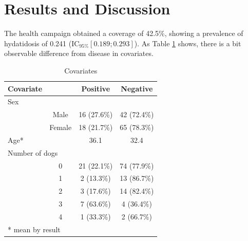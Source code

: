 \documentclass[10pt,letterpaper]{article}
\begin{document}
\section*{Results and Discussion}
The health campaign obtained a coverage of 42.5\%, showing a prevalence of hydatidosis of 0.241 (IC$_{95\%} \left[ 0.189; 0.293 \right] $). As Table \ref{covariates} shows, there is a bit observable difference from disease in covariates.
\begin{table}[htbp]
  \centering
    \begin{tabular}{llll}
    \toprule
    \textbf{Covariate} &       & \multicolumn{1}{c}{\textbf{Positive}} & \multicolumn{1}{c}{\textbf{Negative}} \\
    \midrule
    \multicolumn{2}{l}{Sex} &       &  \\
          & \multicolumn{1}{c}{Male} & \multicolumn{1}{c}{16 (27.6\%)} & \multicolumn{1}{c}{42 (72.4\%)} \\
          & \multicolumn{1}{c}{Female} & \multicolumn{1}{c}{18 (21.7\%)} & \multicolumn{1}{c}{65 (78.3\%)} \\
    \midrule
    \multicolumn{2}{l}{Age*} & \multicolumn{1}{c}{36.1} & \multicolumn{1}{c}{32.4} \\
    \midrule
    \multicolumn{2}{l}{Number of dogs} &       &  \\
          & \multicolumn{1}{c}{0} & \multicolumn{1}{c}{21 (22.1\%)} & \multicolumn{1}{c}{74 (77.9\%)} \\
          & \multicolumn{1}{c}{1} & \multicolumn{1}{c}{2 (13.3\%)} & \multicolumn{1}{c}{13 (86.7\%)} \\
          & \multicolumn{1}{c}{2} & \multicolumn{1}{c}{3 (17.6\%)} & \multicolumn{1}{c}{14 (82.4\%)} \\
          & \multicolumn{1}{c}{3} & \multicolumn{1}{c}{7 (63.6\%)} & \multicolumn{1}{c}{4 (36.4\%)} \\
          & \multicolumn{1}{c}{4} & \multicolumn{1}{c}{1 (33.3\%)} & \multicolumn{1}{c}{2 (66.7\%)} \\
    \midrule
    \multicolumn{4}{l}{* mean by result} \\
    \end{tabular}%
  \caption{Covariates}
  \label{covariates}%
\end{table}%
\end{document}
